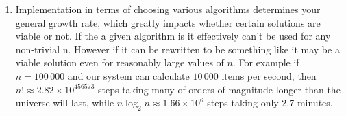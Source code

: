 \documentclass[12pt]{chmullighw}
\begin{document}
\begin{enumerate}
\item Implementation in terms of choosing various algorithms determines your general
growth rate, which greatly impacts whether certain solutions are viable or not. If
the a given algorithm is  it effectively can't be used for any non-trivial n.
However if it can be rewritten to be something like  it may be a
viable solution even for reasonably large values of $n$. For example if
$n = 100\,000$ and our system can calculate $10\,000$ items per second, then
$n! \approx 2.82\times10^{456573}$ steps taking many of orders of magnitude longer
than the universe will last, while $n \log_2 n \approx 1.66\times10^6$ steps
taking only 2.7 minutes. 

\end{enumerate} %
\end{document}
